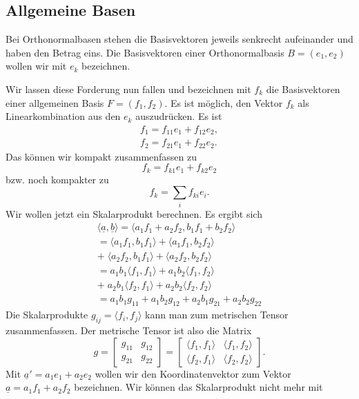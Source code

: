 \documentclass[a4paper,10pt,fleqn,twocolumn,twoside]{article}
\begin{document}
\subsection{Allgemeine Basen}

Bei Orthonormalbasen stehen die Basisvektoren jeweils senkrecht
aufeinander und haben den Betrag eins. Die Basisvektoren einer
Orthonormalbasis \(B=(e_1,e_2)\) wollen wir mit \(e_k\) bezeichnen.

Wir lassen diese Forderung nun fallen und bezeichnen mit \(f_k\) die
Basisvektoren einer allgemeinen Basis \(F=(f_1,f_2)\). Es ist
möglich, den Vektor \(f_k\) als Linearkombination aus den
\(e_k\) auszudrücken. Es ist
\begin{gather*}
f_1 = f_{11}e_1+f_{12}e_2,\\
f_2 = f_{21}e_1+f_{22}e_2.
\end{gather*}
\noindent
Das können wir kompakt zusammenfassen zu
\[f_k = f_{k1}e_1+f_{k2}e_2\]
\noindent
bzw. noch kompakter zu
\[f_k = \sum_{i}f_{ki}e_i.\]
\noindent
Wir wollen jetzt ein Skalarprodukt berechnen. Es ergibt sich
\begin{gather*}
\langle\underline a,\underline b\rangle
= \langle a_1f_1+a_2f_2,b_1f_1+b_2f_2\rangle\\
= \langle a_1f_1,b_1f_1\rangle
+ \langle a_1f_1,b_2f_2\rangle\\
+\;\langle a_2f_2,b_1f_1\rangle
+ \langle a_2f_2,b_2f_2\rangle\\
= a_1b_1\langle f_1,f_1\rangle
+ a_1b_2\langle f_1,f_2\rangle\\
+\;a_2b_1\langle f_2,f_1\rangle
+ a_2b_2\langle f_2,f_2\rangle\\
= a_1b_1 g_{11} + a_1b_2 g_{12}
+ a_2b_1 g_{21} + a_2b_2 g_{22}
\end{gather*}
\noindent
Die Skalarprodukte \(g_{ij} = \langle f_i,f_j\rangle\) kann man
zum metrischen Tensor zusammenfassen. Der metrische Tensor ist also
die Matrix
\[g = \begin{bmatrix}
g_{11} & g_{12}\\
g_{21} & g_{22}
\end{bmatrix}
= \begin{bmatrix}\langle f_1,f_1\rangle & \langle f_1,f_2\rangle\\
\langle f_2,f_1\rangle & \langle f_2,f_2\rangle
\end{bmatrix}.\]
\noindent
Mit \(\underline a' = a_1e_1+a_2e_2\) wollen wir den
Koordinatenvektor zum Vektor \(\underline a = a_1f_1+a_2f_2\)
bezeichnen. Wir können das Skalarprodukt nicht mehr mit
\end{document}
